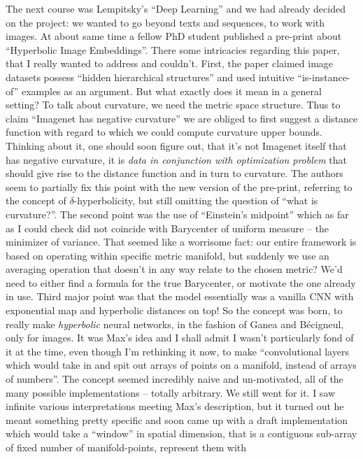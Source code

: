 The next course was Lempitsky's ``Deep Learning'' and we had already decided on
the project: we wanted to go beyond texts and sequences, to work with images.
At about same time a fellow PhD student published a pre-print about
``Hyperbolic Image Embeddings''. There some intricacies regarding this
paper, that I really wanted to address and couldn't. First, the paper claimed
image datasets possess ``hidden hierarchical structures'' and used intuitive
``is-instance-of'' examples as an argument. But what exactly does it mean in a
general setting? To talk about curvature, we need the metric space structure.
Thus to claim ``Imagenet has negative curvature'' we are obliged to first
suggest a distance function with regard to which we could compute curvature
upper bounds. Thinking about it, one should soon figure out, that it's not
Imagenet itself that has negative curvature, it is \emph{data in conjunction
with optimization problem} that should give rise to the distance function and
in turn to curvature. The authors seem to partially fix this point with the new
version of the pre-print, referring to the concept of \( \delta \)-hyperbolicity,
but still omitting the question of ``what is curvature?''.
The second point was the use of ``Einstein's midpoint''
which as far as I could check did not coincide with Barycenter of uniform
measure -- the minimizer of variance. That seemed like
a worrisome fact: our entire framework is based on operating within specific
metric manifold, but suddenly we use an averaging operation that doesn't in any
way relate to the chosen metric? We'd need to either find a formula for the
true Barycenter, or motivate the one already in use. Third major point was that
the model essentially was a vanilla CNN with exponential map and hyperbolic
distances on top! So the concept was born, to really make \emph{hyperbolic}
neural networks, in the fashion of Ganea and B\'ecigneul, only for images.
It was Max's idea and I shall admit I wasn't particularly fond of it at the
time, even though I'm rethinking it now, to make ``convolutional layers which
would take in and spit out arrays of points on a manifold, instead of arrays of
numbers''. The concept seemed incredibly naive and un-motivated, all of the
many possible implementations -- totally arbitrary. We still went for it.  I
saw infinite various interpretations meeting Max's description, but it turned
out he meant something pretty specific and soon came up with a draft
implementation which would take a ``window'' in spatial dimension, that is a
contiguous sub-array of fixed number of manifold-points, represent them with
